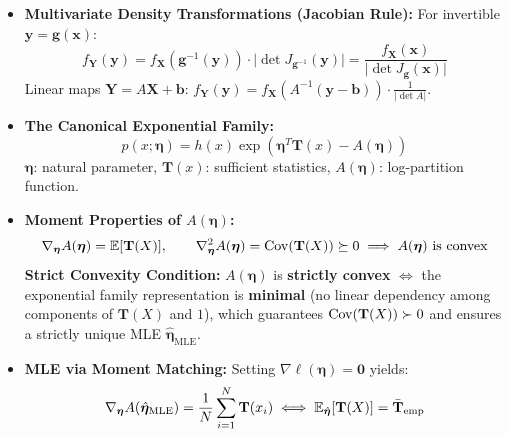 \begin{tcolorbox}[breakable, colback=tealbg!30, colframe=tealborder, title={\large \textbf{6. Probability Foundations, The Exponential Family \& GLMs (Weeks 10--11)}}]
\begin{itemize}[leftmargin=*, noitemsep, topsep=2pt]
    \item \textbf{Multivariate Density Transformations (Jacobian Rule):}
    For invertible $\mathbf{y} = \mathbf{g}(\mathbf{x})$:
    \begin{equation*}
    f_{\mathbf{Y}}(\mathbf{y}) = f_{\mathbf{X}}(\mathbf{g}^{-1}(\mathbf{y})) \cdot \big|\det J_{\mathbf{g}^{-1}}(\mathbf{y})\big| = \frac{f_{\mathbf{X}}(\mathbf{x})}{\big|\det J_{\mathbf{g}}(\mathbf{x})\big|}
    \end{equation*}
    Linear maps $\mathbf{Y} = A\mathbf{X} + \mathbf{b}$: $f_{\mathbf{Y}}(\mathbf{y}) = f_{\mathbf{X}}(A^{-1}(\mathbf{y} - \mathbf{b})) \cdot \frac{1}{|\det A|}$.
    \item \textbf{The Canonical Exponential Family:}
    \begin{equation*}
    p(x; \boldsymbol{\eta}) = h(x) \exp\left( \boldsymbol{\eta}^T \mathbf{T}(x) - A(\boldsymbol{\eta}) \right)
    \end{equation*}
    $\boldsymbol{\eta}$: natural parameter, $\mathbf{T}(x)$: sufficient statistics, $A(\boldsymbol{\eta})$: log-partition function.
    \item \textbf{Moment Properties of $A(\boldsymbol{\eta})$:}
    \begin{equation*}
    \nabla_{\boldsymbol{\eta}} A(\boldsymbol{\eta}) = \operatorname{\mathbb{E}}[\mathbf{T}(X)], \qquad \nabla_{\boldsymbol{\eta}}^2 A(\boldsymbol{\eta}) = \operatorname{Cov}(\mathbf{T}(X)) \succeq 0 \implies A(\boldsymbol{\eta}) \text{ is convex}
    \end{equation*}
    \textbf{Strict Convexity Condition:} $A(\boldsymbol{\eta})$ is \textbf{strictly convex} $\iff$ the exponential family representation is \textbf{minimal} (no linear dependency among components of $\mathbf{T}(X)$ and $1$), which guarantees $\operatorname{Cov}(\mathbf{T}(X)) \succ 0$ and ensures a strictly unique MLE $\hat{\boldsymbol{\eta}}_{\text{MLE}}$.
    \item \textbf{MLE via Moment Matching:} Setting $\nabla \ell(\boldsymbol{\eta}) = \mathbf{0}$ yields:
    \begin{equation*}
    \nabla_{\boldsymbol{\eta}} A(\hat{\boldsymbol{\eta}}_{\text{MLE}}) = \frac{1}{N}\sum_{i=1}^N \mathbf{T}(x_i) \iff \E_{\hat{\boldsymbol{\eta}}}[\mathbf{T}(X)] = \bar{\mathbf{T}}_{\text{emp}}

\end{equation*}
\end{itemize}
\end{tcolorbox}
